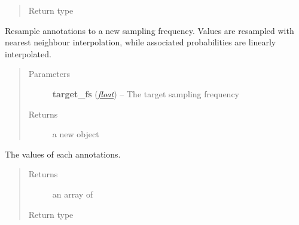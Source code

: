 \documentclass[letterpaper,10pt,english]{sphinxmanual}
\begin{document}
\begin{fulllineitems}
\begin{fulllineitems}
\begin{quote}
\begin{description}
\item[{Return type}] \leavevmode
\href{http://docs.scipy.org/doc/numpy/reference/generated/numpy.ndarray.html\#numpy.ndarray}{}

\end{description}\end{quote}

\end{fulllineitems}


\begin{fulllineitems}
\label{pyrem.time_series:pyrem.time_series.Annotation.resample}
Resample annotations to a new sampling frequency.
Values are resampled with nearest neighbour interpolation,
while associated probabilities are linearly interpolated.
\begin{quote}\begin{description}
\item[{Parameters}] \leavevmode
\textbf{target\_fs} (\href{http://docs.python.org/2.7/library/functions.html\#float}{\emph{float}}) -- The target sampling frequency

\item[{Returns}] \leavevmode
a new  {\hyperref[pyrem.time_series:pyrem.time_series.Annotation]{}} object

\end{description}\end{quote}

\end{fulllineitems}


\begin{fulllineitems}
\label{pyrem.time_series:pyrem.time_series.Annotation.values}
The values of each annotations.
\begin{quote}\begin{description}
\item[{Returns}] \leavevmode
an array of 

\item[{Return type}] \leavevmode
\href{http://docs.scipy.org/doc/numpy/reference/generated/numpy.ndarray.html\#numpy.ndarray}{}

\end{description}\end{quote}

\end{fulllineitems}


\end{fulllineitems}
\end{document}
